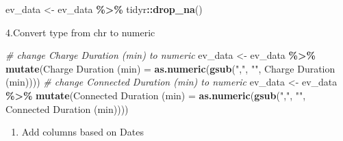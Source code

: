 \documentclass[
  12pt,
]{article}
\newenvironment{Shaded}{\begin{snugshade}}{\end{snugshade}}
\newcommand{\AttributeTok}[1]{\textcolor[rgb]{0.13,0.29,0.53}{#1}}
\newcommand{\CommentTok}[1]{\textcolor[rgb]{0.56,0.35,0.01}{\textit{#1}}}
\newcommand{\FunctionTok}[1]{\textcolor[rgb]{0.13,0.29,0.53}{\textbf{#1}}}
\newcommand{\NormalTok}[1]{#1}
\newcommand{\OtherTok}[1]{\textcolor[rgb]{0.56,0.35,0.01}{#1}}
\newcommand{\SpecialCharTok}[1]{\textcolor[rgb]{0.81,0.36,0.00}{\textbf{#1}}}
\newcommand{\StringTok}[1]{\textcolor[rgb]{0.31,0.60,0.02}{#1}}
\providecommand{\tightlist}{%
  \setlength{\itemsep}{0pt}\setlength{\parskip}{0pt}}
\begin{document}
\begin{Shaded}
\begin{Highlighting}[]
\NormalTok{ev\_data }\OtherTok{\textless{}{-}}\NormalTok{ ev\_data }\SpecialCharTok{\%\textgreater{}\%}
\NormalTok{    tidyr}\SpecialCharTok{::}\FunctionTok{drop\_na}\NormalTok{()}
\end{Highlighting}
\end{Shaded}

4.Convert type from chr to numeric

\begin{Shaded}
\begin{Highlighting}[]
\CommentTok{\# change Charge Duration (min) to numeric}
\NormalTok{ev\_data }\OtherTok{\textless{}{-}}\NormalTok{ ev\_data }\SpecialCharTok{\%\textgreater{}\%}
    \FunctionTok{mutate}\NormalTok{(}\StringTok{\textasciigrave{}}\AttributeTok{Charge Duration (min)}\StringTok{\textasciigrave{}} \OtherTok{=} \FunctionTok{as.numeric}\NormalTok{(}\FunctionTok{gsub}\NormalTok{(}\StringTok{","}\NormalTok{, }\StringTok{""}\NormalTok{,}
        \StringTok{\textasciigrave{}}\AttributeTok{Charge Duration (min)}\StringTok{\textasciigrave{}}\NormalTok{)))}
\CommentTok{\# change Connected Duration (min) to numeric}
\NormalTok{ev\_data }\OtherTok{\textless{}{-}}\NormalTok{ ev\_data }\SpecialCharTok{\%\textgreater{}\%}
    \FunctionTok{mutate}\NormalTok{(}\StringTok{\textasciigrave{}}\AttributeTok{Connected Duration (min)}\StringTok{\textasciigrave{}} \OtherTok{=} \FunctionTok{as.numeric}\NormalTok{(}\FunctionTok{gsub}\NormalTok{(}\StringTok{","}\NormalTok{,}
        \StringTok{""}\NormalTok{, }\StringTok{\textasciigrave{}}\AttributeTok{Connected Duration (min)}\StringTok{\textasciigrave{}}\NormalTok{)))}
\end{Highlighting}
\end{Shaded}

\begin{enumerate}
\def\labelenumi{\arabic{enumi}.}
\setcounter{enumi}{4}
\tightlist
\item
  Add columns based on Dates
\end{enumerate}
\end{document}
